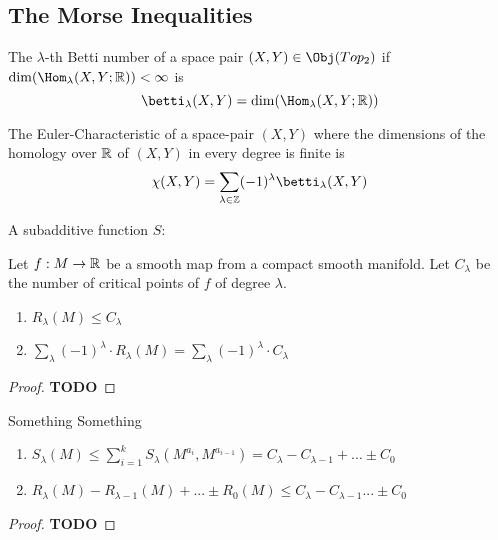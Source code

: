 \subsection{The Morse Inequalities}

\begin{definition}
   The $\lambda$-th Betti number of a space pair 
   $(X, Y) \in \Obj(Top_2)$ if $\dim(\Hom_{\lambda}(X, Y; \R)) < \infty$ is
   \[ \betti_{\lambda}(X, Y) = \dim(\Hom_{\lambda}(X, Y; \R)) \]

   The Euler-Characteristic of a space-pair $(X, Y)$ where the dimensions of the
   homology over ${\mathbb R}$ of $(X, Y)$ in every degree is finite is
   \[ \chi (X, Y) = \sum_{\lambda \in \Z} (-1)^{\lambda}\betti_{\lambda}(X, Y) \]
\end{definition}

\begin{definition}
   A subadditive function $S: $
\end{definition}

\begin{lemma}
   \label{lemma:weak morse inequalities}
   Let $f: M \rightarrow {\mathbb R}$ be a smooth map from a compact smooth manifold. Let 
   $C_{\lambda}$ be the number of critical points of $f$ of degree $\lambda$.
   \begin{enumerate}
      \item $R_{\lambda} (M) \leq C_{\lambda}$
      \item $\sum_{\lambda} (-1)^{\lambda} \cdot R_{\lambda}(M) = 
         \sum_{\lambda} (-1)^{\lambda} \cdot C_{\lambda} $
   \end{enumerate}
\end{lemma}

\begin{proof}
   \textbf{TODO}
\end{proof}

\begin{lemma}
   \label{lemma:strung morse inequalities}
   Something Something
   \begin{enumerate}
      \item $ S_{\lambda}(M) \leq \sum_{i = 1}^k S_{\lambda}(M^{a_i}, M^{a_{i-1}}) 
         = C_{\lambda} - C_{\lambda - 1} + ... \pm C_0 $
      \item $ R_{\lambda}(M) - R_{\lambda - 1}(M) + ... \pm R_0(M) \leq C_{\lambda} - C_{\lambda - 1} ... \pm C_0 $
   \end{enumerate}
\end{lemma}

\begin{proof}
   \textbf{TODO}
\end{proof}

